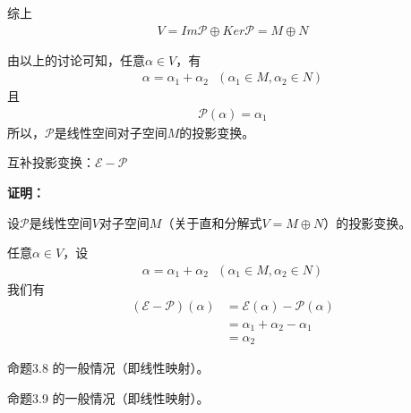\documentclass{article}
\begin{document}
\begin{itemize}
        综上
        \begin{align*}
          V = Im\mathscr{P} \oplus Ker\mathscr{P} = M \oplus N
        \end{align*}

        由以上的讨论可知，任意$\alpha \in V$，有
        \begin{align*}
          \alpha = \alpha_1 + \alpha_2 \ \ \ (\alpha_1 \in M, \alpha_2 \in N)
        \end{align*}
        且
        \begin{align*}
          \mathscr{P}( \alpha ) = \alpha_1
        \end{align*}
        所以，$\mathscr{P}$是线性空间对子空间$M$的投影变换。
\end{itemize}

\begin{zremark}
  互补投影变换：$\mathscr{E} - \mathscr{P}$
\end{zremark}

\textbf{证明：}

设$\mathscr{P}$是线性空间$V$对子空间$M$（关于直和分解式$V = M \oplus N$）的投影变换。

任意$\alpha \in V$，设
\begin{align*}
  \alpha = \alpha_1 + \alpha_2 \ \ \ (\alpha_1 \in M, \alpha_2 \in N)
\end{align*}
我们有
\begin{align*}
  (\mathscr{E} - \mathscr{P})(\alpha)
   & = \mathscr{E}(\alpha) - \mathscr{P}(\alpha) \\
   & = \alpha_1 + \alpha_2 - \alpha_1            \\
   & = \alpha_2
\end{align*}

\begin{zremark}
  命题3.8 的一般情况（即线性映射）。
\end{zremark}

\begin{zremark}
  命题3.9 的一般情况（即线性映射）。
\end{zremark}
\end{document}
